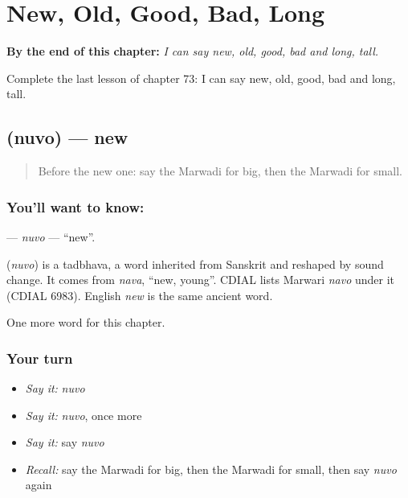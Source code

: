 
\chapter{New, Old, Good, Bad, Long}
\label{ch:mw-new-old-good-bad-long}

\begin{chapteropening}
\textbf{By the end of this chapter:} \emph{I can say new, old, good, bad and long, tall.}

Complete the last lesson of chapter 73: I can say new, old, good, bad and long, tall.
\end{chapteropening}

\section[\texorpdfstring{\mw{नुवो} (nuvo)}{नुवो (nuvo)}]{ (nuvo) — new}

\label{lesson:MW-C73-nuvo}



\begin{quote}
Before the new one: say the Marwadi for big, then the Marwadi for small.
\end{quote}

\subsection*{You'll want to know: }
\textbf{} — \emph{nuvo} — \textquotedblleft{}new\textquotedblright{}.

\begin{cousinweb}
\textbf{} (\emph{nuvo}) is a tadbhava, a word inherited from Sanskrit and reshaped by sound change. It comes from \emph{nava}, \textquotedblleft{}new, young\textquotedblright{}. CDIAL lists Marwari \emph{navo} under it (CDIAL 6983). English \emph{new} is the same ancient word.
\end{cousinweb}

\begin{grammarlens}[title={What you've built}]
One more word for this chapter.
\end{grammarlens}

\subsection*{Your turn}
\begin{itemize}
\raggedright
  \item \emph{Say it:} \emph{nuvo}
  \item \emph{Say it:} \emph{nuvo}, once more
  \item \emph{Say it:} say \emph{nuvo}
  \item \emph{Recall:} say the Marwadi for big, then the Marwadi for small, then say \emph{nuvo} again
\end{itemize}

